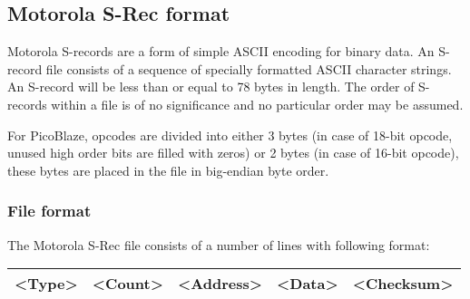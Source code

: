     \clearpage
    \subsection{Motorola S-Rec format}
        Motorola S-records are a form of simple ASCII encoding for binary data. An S-record file consists of a sequence of specially formatted ASCII character strings. An S-record will be less than or equal to 78 bytes in length. The order of S-records within a file is of no significance and no particular order may be assumed.

        For PicoBlaze, opcodes are divided into either 3 bytes (in case of 18-bit opcode, unused high order bits are filled with zeros) or 2 bytes (in case of 16-bit opcode), these bytes are placed in the file in big-endian byte order.

        \subsubsection{File format}
            The Motorola S-Rec file consists of a number of lines with following format:

            \begin{tabular}{|ccccc|}
                \hline
                <Type> & <Count> & <Address> & <Data> & <Checksum> \\\hline
            \end{tabular}

